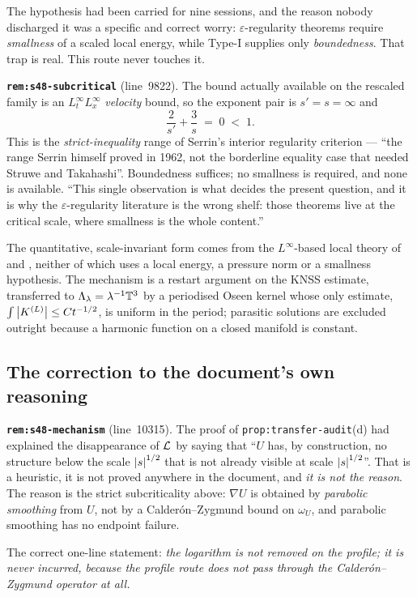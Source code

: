 The hypothesis had been carried for nine sessions, and the reason nobody
discharged it was a specific and correct worry:
\(\varepsilon\)-regularity theorems require \emph{smallness} of a scaled local
energy, while Type-I supplies only \emph{boundedness}. That trap is real. This
route never touches it.

\begin{record}
\textbf{\texttt{rem:s48-subcritical}} (line~9822). The bound actually
available on the rescaled family is an \(L^\infty_tL^\infty_x\) \emph{velocity}
bound, so the exponent pair is \(s'=s=\infty\) and
\[
  \frac{2}{s'}+\frac{3}{s} \;=\; 0 \;<\; 1 .
\]
This is the \emph{strict-inequality} range of Serrin's interior regularity
criterion --- ``the range Serrin himself proved in 1962, not the borderline
equality case that needed Struwe and Takahashi''. Boundedness suffices; no
smallness is required, and none is available. ``This single observation is
what decides the present question, and it is why the \(\varepsilon\)-regularity
literature is the wrong shelf: those theorems live at the critical scale, where
smallness is the whole content.''
\end{record}

The quantitative, scale-invariant form comes from the \(L^\infty\)-based local
theory of \cite[\S4]{KNSS2009} and \cite[Thm.~2.4]{SereginSverak2009}, neither
of which uses a local energy, a pressure norm or a smallness hypothesis. The
mechanism is a restart argument on the KNSS estimate, transferred to
\(\Lambda_\lambda=\lambda^{-1}\mathbb{T}^3\) by a periodised Oseen kernel whose only
estimate, \(\int\left|K^{(L)}\right|\le Ct^{-1/2}\), is uniform in the period;
parasitic solutions are excluded outright because a harmonic function on a
closed manifold is constant.

\subsection{The correction to the document's own reasoning}

\begin{record}
\textbf{\texttt{rem:s48-mechanism}} (line~10315). The proof of
\texttt{prop:transfer-audit}(d) had explained the disappearance of \(\mathcal{L}\)
by saying that ``\(U\) has, by construction, no structure below the scale
\(\left|s\right|^{1/2}\) that is not already visible at scale \(\left|s\right|^{1/2}\)''.
That is a heuristic, it is not proved anywhere in the document, and \emph{it
is not the reason}. The reason is the strict subcriticality above:
\(\nabla U\) is obtained by \emph{parabolic smoothing} from \(U\), not by a
Calder\'on--Zygmund bound on \(\omega_U\), and parabolic smoothing has no
endpoint failure.

\smallskip
The correct one-line statement: \emph{the logarithm is not removed on the
profile; it is never incurred, because the profile route does not pass through
the Calder\'on--Zygmund operator at all.}
\end{record}

